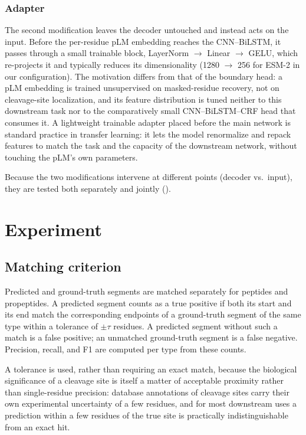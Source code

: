 \documentclass{article}
\begin{document}
\subsubsection{Adapter}
\label{sec:adapter}

The second modification leaves the decoder untouched and instead acts on the input. Before the per-residue pLM embedding reaches the CNN--BiLSTM, it passes through a small trainable block, LayerNorm $\to$ Linear $\to$ GELU, which re-projects it and typically reduces its dimensionality (1280 $\to$ 256 for ESM-2 in our configuration). The motivation differs from that of the boundary head: a pLM embedding is trained unsupervised on masked-residue recovery, not on cleavage-site localization, and its feature distribution is tuned neither to this downstream task nor to the comparatively small CNN--BiLSTM--CRF head that consumes it. A lightweight trainable adapter placed before the main network is standard practice in transfer learning: it lets the model renormalize and repack features to match the task and the capacity of the downstream network, without touching the pLM's own parameters.

Because the two modifications intervene at different points (decoder vs.\ input), they are tested both separately and jointly ().

\section{Experiment}
\label{sec:eval}

\subsection{Matching criterion}
\label{sec:matching}

Predicted and ground-truth segments are matched separately for peptides and propeptides. A predicted segment counts as a true positive if both its start and its end match the corresponding endpoints of a ground-truth segment of the same type within a tolerance of $\pm\tau$ residues. A predicted segment without such a match is a false positive; an unmatched ground-truth segment is a false negative. Precision, recall, and F1 are computed per type from these counts.

A tolerance is used, rather than requiring an exact match, because the biological significance of a cleavage site is itself a matter of acceptable proximity rather than single-residue precision: database annotations of cleavage sites carry their own experimental uncertainty of a few residues, and for most downstream uses a prediction within a few residues of the true site is practically indistinguishable from an exact hit.
\end{document}
